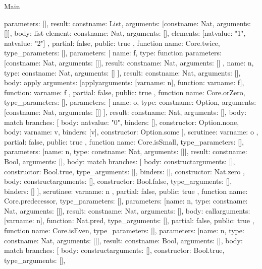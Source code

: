 \begin{lexlean}{Main}
\begin{toolingmodule}
{{      parameters: [],
      result: const{name: List, arguments: [const{name: Nat, arguments: []}]},
      body: list{
        element: const{name: Nat, arguments: []},
        elements: [nat{value: "1"}, nat{value: "2"}]
      },
      partial: false,
      public: true
    },
    function{
      name: Core.twice,
      type_parameters: [],
      parameters: [
        {
          name: f,
          type: function{
            parameters: [const{name: Nat, arguments: []}],
            result: const{name: Nat, arguments: []}
          }
        },
        {name: n, type: const{name: Nat, arguments: []}}
      ],
      result: const{name: Nat, arguments: []},
      body: apply{
        arguments: [apply{arguments: [var{name: n}], function: var{name: f}}],
        function: var{name: f}
      },
      partial: false,
      public: true
    },
    function{
      name: Core.orZero,
      type_parameters: [],
      parameters: [
        {name: o, type: const{name: Option, arguments: [const{name: Nat, arguments: []}]}}
      ],
      result: const{name: Nat, arguments: []},
      body: match{
        branches: [
          {body: nat{value: "0"}, binders: [], constructor: Option.none},
          {body: var{name: v}, binders: [v], constructor: Option.some}
        ],
        scrutinee: var{name: o}
      },
      partial: false,
      public: true
    },
    function{
      name: Core.isSmall,
      type_parameters: [],
      parameters: [{name: n, type: const{name: Nat, arguments: []}}],
      result: const{name: Bool, arguments: []},
      body: match{
        branches: [
          {
            body: construct{arguments: [], constructor: Bool.true, type_arguments: []},
            binders: [],
            constructor: Nat.zero
          },
          {body: construct{arguments: [], constructor: Bool.false, type_arguments: []}, binders: []}
        ],
        scrutinee: var{name: n}
      },
      partial: false,
      public: true
    },
    function{
      name: Core.predecessor,
      type_parameters: [],
      parameters: [{name: n, type: const{name: Nat, arguments: []}}],
      result: const{name: Nat, arguments: []},
      body: call{arguments: [var{name: n}], function: Nat.pred, type_arguments: []},
      partial: false,
      public: true
    },
    function{
      name: Core.isEven,
      type_parameters: [],
      parameters: [{name: n, type: const{name: Nat, arguments: []}}],
      result: const{name: Bool, arguments: []},
      body: match{
        branches: [
          {
            body: construct{arguments: [], constructor: Bool.true, type_arguments: []},
}}}}
\end{toolingmodule}
\end{lexlean}
